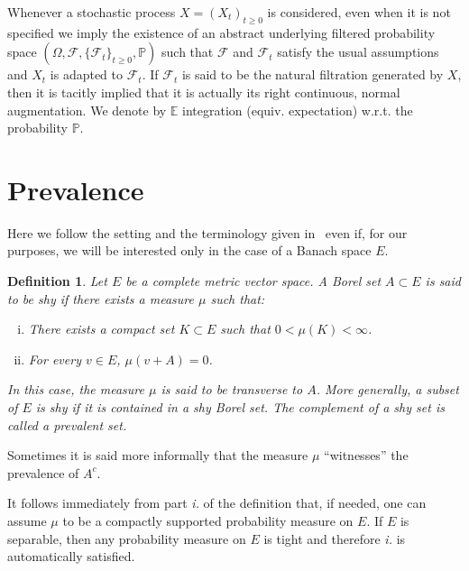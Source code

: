 \documentclass[10pt]{article}
\newcommand{\tmtextit}[1]{{\itshape{#1}}}
\newenvironment{enumerateroman}{\begin{enumerate}[i.] }{\end{enumerate}}
\newtheorem{definition}{Definition}
\begin{document}
Whenever a stochastic process $X = (X_t)_{t \geqslant 0}$ is considered, even
when it is not specified we imply the existence of an abstract underlying
filtered probability space $(\Omega, \mathcal{F}, \{ \mathcal{F}_t \}_{t
\geqslant 0}, \mathbb{P})$ such that $\mathcal{F}$ and $\mathcal{F}_t$ satisfy
the usual assumptions and $X_t$ is adapted to $\mathcal{F}_t$. If
$\mathcal{F}_t$ is said to be the natural filtration generated by $X$, then it
is tacitly implied that it is actually its right continuous, normal
augmentation. We denote by $\mathbb{E}$ integration (equiv. expectation)
w.r.t. the probability $\mathbb{P}$.

\section{Prevalence}\label{sec2}

Here we follow the setting and the terminology given in~{\cite{huntsauer}} even if,
for our purposes, we will be interested only in the case of a Banach space
$E$.

\begin{definition}
  \label{definition prevalence}Let $E$ be a complete metric vector space. A
  Borel set $A \subset E$ is said to be \tmtextit{shy} if there exists a
  measure $\mu$ such that:
  \begin{enumerateroman}
    \item There exists a compact set $K \subset E$ such that $0 < \mu (K) <
    \infty$.
    
    \item For every $v \in E$, $\mu (v + A) = 0$.
  \end{enumerateroman}
  In this case, the measure $\mu$ is said to be transverse to $A$. More
  generally, a subset of $E$ is shy if it is contained in a shy Borel set. The
  complement of a shy set is called a prevalent set.
\end{definition}

Sometimes it is said more informally that the measure $\mu$ ``witnesses'' the
prevalence of $A^c$.

It follows immediately from part \tmtextit{i.} of the definition that, if
needed, one can assume $\mu$ to be a compactly supported probability measure
on $E$. If $E$ is separable, then any probability measure on $E$ is tight and
therefore \tmtextit{i.} is automatically satisfied.

\
\end{document}
